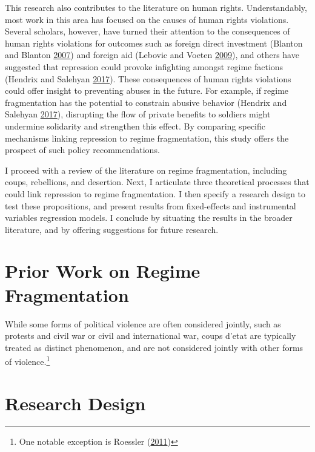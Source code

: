 \documentclass[12pt,]{article}
\let\rmarkdownfootnote\footnote%
\def\footnote{\protect\rmarkdownfootnote}
\theoremstyle{definition}
\theoremstyle{definition}
\theoremstyle{definition}
\theoremstyle{remark}
\begin{document}
This research also contributes to the literature on human rights.
Understandably, most work in this area has focused on the causes of
human rights violations. Several scholars, however, have turned their
attention to the consequences of human rights violations for outcomes
such as foreign direct investment (Blanton and Blanton
\protect\hyperlink{ref-Blanton2007}{2007}) and foreign aid (Lebovic and
Voeten \protect\hyperlink{ref-Lebovic2009}{2009}), and others have
suggested that repression could provoke infighting amongst regime
factions (Hendrix and Salehyan
\protect\hyperlink{ref-Hendrix2017}{2017}). These consequences of human
rights violations could offer insight to preventing abuses in the
future. For example, if regime fragmentation has the potential to
constrain abusive behavior (Hendrix and Salehyan
\protect\hyperlink{ref-Hendrix2017}{2017}), disrupting the flow of
private benefits to soldiers might undermine solidarity and strengthen
this effect. By comparing specific mechanisms linking repression to
regime fragmentation, this study offers the prospect of such policy
recommendations.

I proceed with a review of the literature on regime fragmentation,
including coups, rebellions, and desertion. Next, I articulate three
theoretical processes that could link repression to regime
fragmentation. I then specify a research design to test these
propositions, and present results from fixed-effects and instrumental
variables regression models. I conclude by situating the results in the
broader literature, and by offering suggestions for future research.

\hypertarget{prior-work-on-regime-fragmentation}{%
\section{Prior Work on Regime
Fragmentation}\label{prior-work-on-regime-fragmentation}}

While some forms of political violence are often considered jointly,
such as protests and civil war or civil and international war, coups
d'etat are typically treated as distinct phenomenon, and are not
considered jointly with other forms of violence.\footnote{One notable
  exception is Roessler (\protect\hyperlink{ref-Roessler2011}{2011})}

\hypertarget{research-design}{%
\section{Research Design}\label{research-design}}
\end{document}
